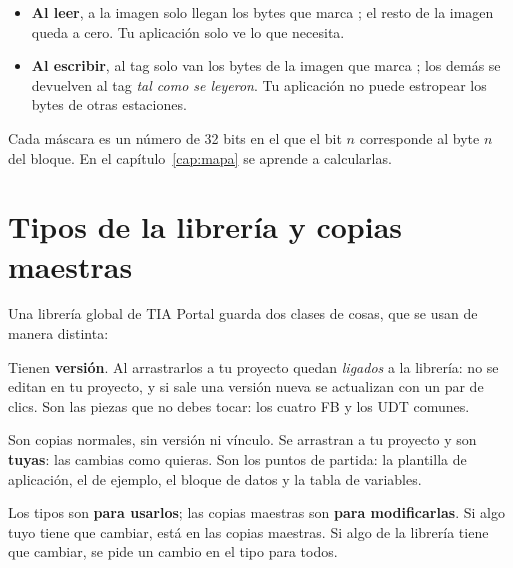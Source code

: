 \begin{itemize}
\item \textbf{Al leer}, a la imagen solo llegan los bytes que marca ; el resto de la imagen queda a cero. Tu aplicación solo ve lo que necesita.
\item \textbf{Al escribir}, al tag solo van los bytes de la imagen que marca ; los demás se devuelven al tag \emph{tal como se leyeron}. Tu aplicación no puede estropear los bytes de otras estaciones.
\end{itemize}

Cada máscara es un número de 32 bits en el que el bit $n$ corresponde al byte $n$ del bloque. En el capítulo~\ref{cap:mapa} se aprende a calcularlas.

\section{Tipos de la librería y copias maestras}\label{sec:tipos-copias}
Una librería global de TIA Portal guarda dos clases de cosas, que se usan de manera distinta:

\begin{description}[style=nextline,leftmargin=1.2cm]
\item[Tipos (\emph{Types}).] Tienen \textbf{versión}. Al arrastrarlos a tu proyecto quedan \emph{ligados} a la librería: no se editan en tu proyecto, y si sale una versión nueva se actualizan con un par de clics. Son las piezas que no debes tocar: los cuatro FB y los UDT comunes.
\item[Copias maestras (\emph{Master copies}).] Son copias normales, sin versión ni vínculo. Se arrastran a tu proyecto y son \textbf{tuyas}: las cambias como quieras. Son los puntos de partida: la plantilla de aplicación, el  de ejemplo, el bloque de datos y la tabla de variables.
\end{description}

\begin{idea}
Los tipos son \textbf{para usarlos}; las copias maestras son \textbf{para modificarlas}. Si algo tuyo tiene que cambiar, está en las copias maestras. Si algo de la librería tiene que cambiar, se pide un cambio en el tipo para todos.
\end{idea}

